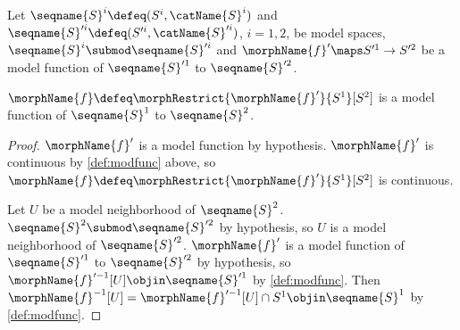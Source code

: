 \documentclass{article}
\begin{document}
\begin{lemma}
\label{lem:modfunc}
Let $\seqname{S}^i \defeq (S^i, \catName{S}^i)$ and
$\seqname{S}'^i \defeq (S'^i, \catName{S}'^i)$, $i=1,2$, be model
spaces, $\seqname{S}^i \submod \seqname{S}'^i$ and
$\morphName{f}' \maps S'^1 \to S'^2$ be a model function of
$\seqname{S}'^1$ to $\seqname{S}'^2$.

$\morphName{f} \defeq \morphRestrict{\morphName{f}'}{S^1}[S^2]$ is a model
function of $\seqname{S}^1$ to $\seqname{S}^2$.

\begin{proof}
$\morphName{f}'$ is a model function by hypothesis.
$\morphName{f}'$ is continuous by \cref{def:modfunc} above, so
$\morphName{f} \defeq \morphRestrict{\morphName{f}'}{S^1}[S^2]$ is continuous.

Let $U$ be a model neighborhood of $\seqname{S}^2$.
$\seqname{S}^2 \submod \seqname{S}'^2$ by hypothesis, so
$U$ is a model neighborhood of $\seqname{S}'^2$.
$\morphName{f}'$ is a model function of $\seqname{S}'^1$ to
$\seqname{S}'^2$ by hypothesis, so
$\morphName{f}'^{-1}[U] \objin \seqname{S}'^1$ by \cref{def:modfunc}.
Then
$
  \morphName{f}^{-1}[U] = \morphName{f}'^{-1}[U] \cap S^1 \objin
  \seqname{S}^1
$
by \cref{def:modfunc}.
\end{proof}
\end{lemma}
\end{document}
